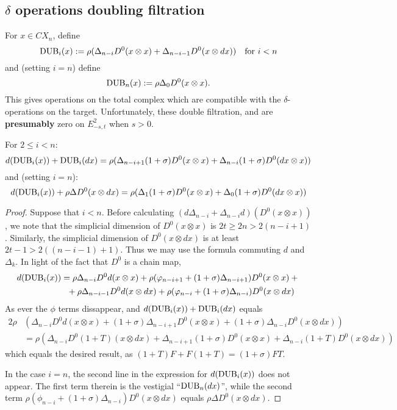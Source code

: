 \documentclass[10pt]{article}
\newcommand{\twist}{\sigma}
\begin{document}
\begin{letter to Dwyer}
\subsection{$\delta$ operations doubling filtration}
For $x\in CX_{n}$, define
\[\textup{DUB}_i(x):=\rho(\Delta_{n-i}D^0(x\otimes x)+\Delta_{n-i-1}D^0(x\otimes dx))\textup{\quad for $i<n$}\]
and (setting $i=n$) define 
\[\textup{DUB}_n(x):=\rho\Delta_{0}D^0(x\otimes x).\]
This gives operations on the total complex which are compatible with the $\delta$-operations on the target. Unfortunately, these double filtration, and are \textbf{presumably} zero on $E^2_{-s,t}$ when $s>0$.
\begin{lem}\label{htpyInducedByBUB}
For $2\leq i<n$:
\[d(\textup{DUB}_i(x))+\textup{DUB}_i(dx)=\rho(\Delta_{n-i+1}(1+\twist)D^0(x\otimes x)+\Delta_{n-i}(1+\twist)D^0(dx\otimes x))\]
and (setting $i=n$):
\[d(\textup{DUB}_i(x))+\rho\Delta D^0(x\otimes dx)=\rho(\Delta_{1}(1+\twist)D^0(x\otimes x)+\Delta_{0}(1+\twist)D^0(dx\otimes x))\]
\end{lem}
\begin{proof}
Suppose that $i<n$. Before calculating $(d\Delta_{n-i}+\Delta_{n-i} d)(D^0(x\otimes x))$, we note that the simplicial dimension of $D^0(x\otimes x)$ is $2t\geq2n>2(n-i+1)$. Similarly, the simplicial dimension of $D^0(x\otimes dx)$ is at least $2t-1>2((n-i-1)+1)$. Thus we may use the formula commuting $d$ and $\Delta_k$. In light of the fact that $D^0$ is a chain map,
\begin{alignat*}{2}
d(\textup{DUB}_i(x))
&=
\rho\Delta_{n-i}D^0d(x\otimes x)+\rho (\phi_{n-i+1}+(1+\twist)\Delta_{n-i+1})D^0(x\otimes x)+{}%
\\
&\ \ +\rho\Delta_{n-i-1}D^0d(x\otimes dx)+\rho (\phi_{n-i}+(1+\twist)\Delta_{n-i})D^0(x\otimes dx)
\end{alignat*}
As ever the $\phi$ terms dissappear, and $d(\textup{DUB}_i(x))+\textup{DUB}_i(dx)$ equals
\begin{alignat*}{2}
\rho&(\Delta_{n-i}D^0d(x\otimes x)+(1+\twist)\Delta_{n-i+1}D^0(x\otimes x)+(1+\twist)\Delta_{n-i}D^0(x\otimes dx))\\
&=\rho(\Delta_{n-i}D^0(1+T)(x\otimes dx)+\Delta_{n-i+1}(1+\twist)D^0(x\otimes x)+\Delta_{n-i}(1+T)D^0(x\otimes dx))
\end{alignat*}
which equals the desired result, as $(1+T)F+F(1+T)=(1+\twist)FT$.

In the case $i=n$, the second line in the expression for $d(\textup{DUB}_i(x))$ does not appear. The first term therein is the vestigial ``$\textup{DUB}_n(dx)$'', while the second term
$\rho (\phi_{n-i}+(1+\twist)\Delta_{n-i})D^0(x\otimes dx)$ equals $\rho\Delta D^0(x\otimes dx)$.
\end{proof}


\end{letter to Dwyer}
\end{document}
